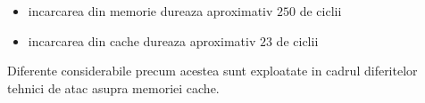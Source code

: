 \begin{itemize}
  \setlength\itemsep{0em}
  \item incarcarea din memorie dureaza aproximativ $250$ de ciclii
  \item incarcarea din cache dureaza aproximativ $23$ de ciclii
\end{itemize}

Diferente considerabile precum acestea sunt exploatate in cadrul diferitelor
tehnici de atac asupra memoriei cache.  %
